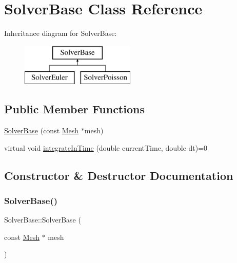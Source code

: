 \hypertarget{class_solver_base}{}\section{Solver\+Base Class Reference}
\label{class_solver_base}
Inheritance diagram for Solver\+Base\+:\begin{figure}[H]
\begin{center}
\leavevmode
\includegraphics[height=2.000000cm]{class_solver_base}
\end{center}
\end{figure}
\subsection*{Public Member Functions}
\begin{DoxyCompactItemize}
\item 
\mbox{\hyperlink{class_solver_base_a378bd67662e76348c3ef38edd312b5e1}{Solver\+Base}} (const \mbox{\hyperlink{class_mesh}{Mesh}} $\ast$mesh)
\item 
virtual void \mbox{\hyperlink{class_solver_base_a14b5e9482f698d36dff3b43d3a4f05f1}{integrate\+In\+Time}} (double current\+Time, double dt)=0
\end{DoxyCompactItemize}


\subsection{Constructor \& Destructor Documentation}
\mbox{\label{class_solver_base_a378bd67662e76348c3ef38edd312b5e1}} 
\subsubsection{\texorpdfstring{Solver\+Base()}{SolverBase()}}
{\footnotesize\ttfamily Solver\+Base\+::\+Solver\+Base (\begin{DoxyParamCaption}\item[{const \mbox{\hyperlink{class_mesh}{Mesh}} $\ast$}]{mesh }\end{DoxyParamCaption})}



